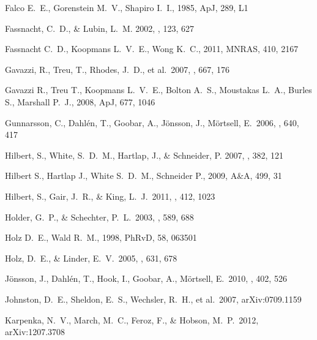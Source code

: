 \begin{thebibliography}{99}
 Falco E.~E., Gorenstein M.~V., Shapiro I.~I., 1985, ApJ, 289, L1 


{Fassnacht}, C.~D., \& {Lubin}, L.~M. 2002, \aj, 123, 627

 Fassnacht C.~D., Koopmans L.~V.~E., Wong K.~C., 2011, MNRAS, 410, 2167 

 Gavazzi, R., Treu, T., 
Rhodes, J.~D., et al.\ 2007, \apj, 667, 176 

 Gavazzi R., Treu T., Koopmans L.~V.~E., 
Bolton A.~S., Moustakas L.~A., Burles S., Marshall P.~J., 2008, ApJ, 677, 
1046 

 Gunnarsson, C., 
Dahl{\'e}n, T., Goobar, A., J{\"o}nsson, J., M{\"o}rtsell, E.\ 2006, \apj, 640, 417 

{Hilbert}, S., {White}, S.~D.~M., {Hartlap}, J., \& {Schneider}, P. 2007,
  \mnras, 382, 121

 Hilbert S., Hartlap J., White S.~D.~M., Schneider P., 2009, A\&A, 499, 31 

 Hilbert, S., Gair, 
J.~R., \& King, L.~J.\ 2011, \mnras, 412, 1023 

 Holder, G.~P., \& Schechter, P.~L.\ 2003, \apj, 589, 688 


 Holz D.~E., Wald R.~M., 1998, PhRvD, 58, 063501 

 Holz, D.~E., \& Linder, E.~V.\ 2005, \apj, 631, 678 

 J{\"o}nsson, J., 
Dahl{\'e}n, T., Hook, I., Goobar, A., M{\"o}rtsell, E.\ 2010, \mnras, 402, 526 

 Johnston, D.~E., 
Sheldon, E.~S., Wechsler, R.~H., et al.\ 2007, arXiv:0709.1159 

 Karpenka, N.~V., 
March, M.~C., Feroz, F., \& Hobson, M.~P.\ 2012, arXiv:1207.3708 


\end{thebibliography}
